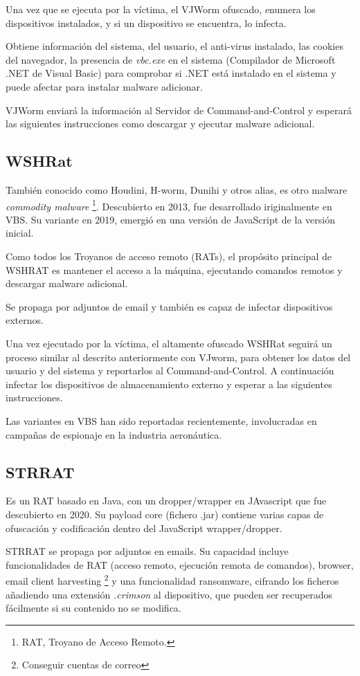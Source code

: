 \documentclass[15pt]{article}
\begin{document}
	Una vez que se ejecuta por la víctima, el VJWorm ofuscado, enumera los dispositivos instalados, y si un dispositivo se encuentra, lo infecta.
	
	Obtiene información del sistema, del usuario, el anti-virus instalado, las cookies del navegador, la presencia de \textit{vbc.exe} en el sistema (Compilador de Microsoft .NET de Visual Basic) para comprobar si .NET está instalado en el sistema y puede afectar para instalar malware adicionar.
	
	VJWorm enviará la información al Servidor de Command-and-Control y esperará las siguientes instrucciones como descargar y ejecutar malware adicional.
	
	\subsection{WSHRat}
	
	También conocido como Houdini, H-worm, Dunihi y otros alias, es otro malware \textit{commodity malware} \footnote{RAT, Troyano de Acceso Remoto.}. Descubierto en 2013, fue desarrollado iriginalmente en VBS. Su variante en 2019, emergió en una versión de JavaScript de la versión inicial.
	
	Como todos los Troyanos de acceso remoto (RATs), el propósito principal de WSHRAT es mantener el acceso a la máquina, ejecutando comandos remotos y descargar malware adicional.
	
	Se propaga por adjuntos de email y también es capaz de infectar dispositivos externos.
	
	Una vez ejecutado por la víctima, el altamente ofuscado WSHRat seguirá un proceso similar al descrito anteriormente con VJworm, para obtener los datos del usuario y del sistema y reportarlos al Command-and-Control. A continuación infectar los dispositivos de almacenamiento externo y esperar a las siguientes instrucciones.
	
	Las variantes en VBS han sido reportadas recientemente, involucradas en campañas de espionaje en la industria aeronáutica.
	
	\subsection{STRRAT}
	Es un RAT basado en Java, con un dropper/wrapper en JAvascript que fue descubierto en 2020. Su payload core (fichero .jar) contiene varias capas de ofuscación y codificación dentro del JavaScript wrapper/dropper.
	
	STRRAT se propaga por adjuntos en emails. Su capacidad incluye funcionalidades de RAT (acceso remoto, ejecución remota de comandos), browser, email client harvesting \footnote{Conseguir cuentas de correo} y una funcionalidad ransomware, cifrando los ficheros añadiendo una extensión \textit{.crimson} al dispositivo, que pueden ser recuperados fácilmente si su contenido no se modifica.
	
\end{document}
